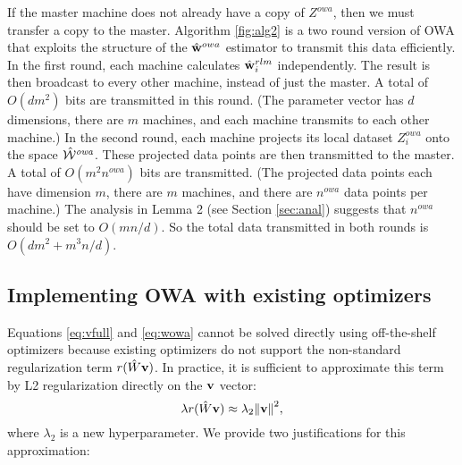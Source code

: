 \documentclass[thesis.tex]{subfiles}
\newcommand{\Zowa}{Z^{\textit{owa}}}
\newcommand{\nowa}{n^{\textit{owa}}}
\begin{document}
If the master machine does not already have a copy of $\Zowa$,
then we must transfer a copy to the master. 
Algorithm \ref{fig:alg2} is a two round version of OWA that exploits the structure of the $\hat{\mathbf w}^{owa}$ estimator to transmit this data efficiently.
In the first round, each machine calculates $\hat{\mathbf w}^{rlm}_i$ independently.
The result is then broadcast to every other machine, instead of just the master.
A total of $O(dm^2)$ bits are transmitted in this round.
(The parameter vector has $d$ dimensions,
there are $m$ machines,
and each machine transmits to each other machine.)
In the second round, each machine projects its local dataset $\Zowa_i$ onto the space ${\hat {{\mathcal W}}^{\textit{owa}}}$.
These projected data points are then transmitted to the master.
A total of $O(m^2\nowa)$ bits are transmitted.
(The projected data points each have dimension $m$, 
there are $m$ machines,
and there are $\nowa$ data points per machine.)
The analysis in Lemma 2 (see Section \ref{sec:anal}) suggests that $\nowa$ should be set to $O(mn/d)$.
So the total data transmitted in both rounds is $O(dm^2 + m^3n/d)$. 

%

\subsection{Implementing OWA with existing optimizers}
\label{sec:lambda2}

Equations \ref{eq:vfull} and \ref{eq:wowa} cannot be solved directly using off-the-shelf optimizers because existing optimizers do not support the non-standard regularization term $r(\hat W\mathbf{v})$.
In practice, it is sufficient to approximate this term by L2 regularization directly on the $\mathbf{v}$ vector:
\begin{equation}
\lambda r(\hat W\mathbf{v}) \approx \lambda_2 {\lVert {\mathbf{v}} \rVert}^2
,
\label{eq:approxreg}
\end{equation}
where $\lambda_2$ is a new hyperparameter.
We provide two justifications for this approximation:
\end{document}
